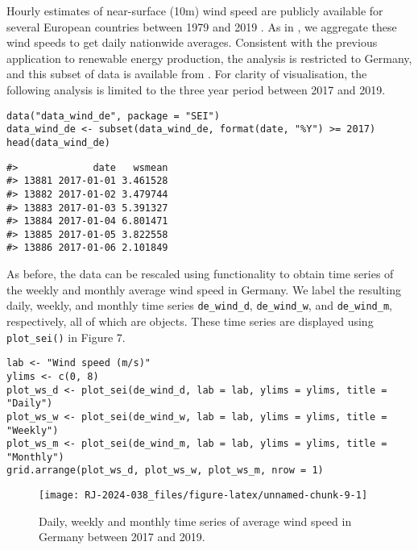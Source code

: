 Hourly estimates of near-surface (10m) wind speed are publicly available for several European countries between 1979 and 2019 \citep{HersbachEtAl2023}. As in \cite{OteroEtAl2022b}, we aggregate these wind speeds to get daily nationwide averages. Consistent with the previous application to renewable energy production, the analysis is restricted to Germany, and this subset of data is available from . For clarity of visualisation, the following analysis is limited to the three year period between 2017 and 2019.

\begin{verbatim}
data("data_wind_de", package = "SEI")
data_wind_de <- subset(data_wind_de, format(date, "%Y") >= 2017)
head(data_wind_de)
\end{verbatim}

\begin{verbatim}
#>             date   wsmean
#> 13881 2017-01-01 3.461528
#> 13882 2017-01-02 3.479744
#> 13883 2017-01-03 5.391327
#> 13884 2017-01-04 6.801471
#> 13885 2017-01-05 3.822558
#> 13886 2017-01-06 2.101849
\end{verbatim}

As before, the data can be rescaled using  functionality to obtain time series of the weekly and monthly average wind speed in Germany. We label the resulting daily, weekly, and monthly time series \texttt{de\_wind\_d}, \texttt{de\_wind\_w}, and \texttt{de\_wind\_m}, respectively, all of which are  objects. These time series are displayed using \texttt{plot\_sei()} in Figure 7.

\begin{verbatim}
lab <- "Wind speed (m/s)"
ylims <- c(0, 8)
plot_ws_d <- plot_sei(de_wind_d, lab = lab, ylims = ylims, title = "Daily")
plot_ws_w <- plot_sei(de_wind_w, lab = lab, ylims = ylims, title = "Weekly")
plot_ws_m <- plot_sei(de_wind_m, lab = lab, ylims = ylims, title = "Monthly")
grid.arrange(plot_ws_d, plot_ws_w, plot_ws_m, nrow = 1)
\end{verbatim}

\begin{figure}

{\centering \texttt{[image: RJ-2024-038\_files/figure-latex/unnamed-chunk-9-1]} 

}

\caption{Daily, weekly and monthly time series of average wind speed in Germany between 2017 and 2019.}\label{fig:unnamed-chunk-9}
\end{figure}

